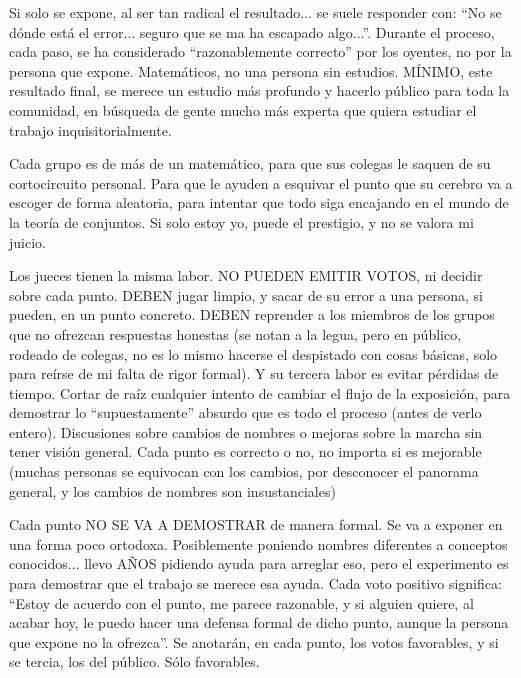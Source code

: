 \noindent
Si solo se expone, al ser tan radical el resultado... se suele responder con: ``No se dónde está el error... seguro que se ma ha escapado algo...''. Durante el proceso, cada paso, se ha considerado ``razonablemente correcto'' por los oyentes, no por la persona que expone. Matemáticos, no una persona sin estudios. MÍNIMO, este resultado final, se merece un estudio más profundo y hacerlo público para toda la comunidad, en búsqueda de gente mucho más experta que quiera estudiar el trabajo inquisitorialmente.

\noindent
Cada grupo es de más de un matemático, para que sus colegas le saquen de su cortocircuito personal. Para que le ayuden a esquivar el punto que su cerebro va a escoger de forma aleatoria, para intentar que todo siga encajando en el mundo de la teoría de conjuntos. Si solo estoy yo, puede el prestigio, y no se valora mi juicio.

\noindent
Los jueces tienen la misma labor. NO PUEDEN EMITIR VOTOS, ni decidir sobre cada punto. DEBEN jugar limpio, y sacar de su error a una persona, si pueden, en un punto concreto. DEBEN reprender a los miembros de los grupos que no ofrezcan respuestas honestas (se notan a la legua, pero en público, rodeado de colegas, no es lo mismo hacerse el despistado con cosas básicas, solo para reírse de mi falta de rigor formal). Y su tercera labor es evitar pérdidas de tiempo. Cortar de raíz cualquier intento de cambiar el flujo de la exposición, para demostrar lo ``supuestamente'' absurdo que es todo el proceso (antes de verlo entero). Discusiones sobre cambios de nombres o mejoras sobre la marcha sin tener visión general. Cada punto es correcto o no, no importa si es mejorable (muchas personas se equivocan con los cambios, por desconocer el panorama general, y los cambios de nombres son insustanciales)

\noindent
Cada punto NO SE VA A DEMOSTRAR de manera formal. Se va a exponer en una forma poco ortodoxa. Posiblemente poniendo nombres diferentes a conceptos conocidos... llevo AÑOS pidiendo ayuda para arreglar eso, pero el experimento es para demostrar que el trabajo se merece esa ayuda. Cada voto positivo significa: ``Estoy de acuerdo con el punto, me parece razonable, y si alguien quiere, al acabar hoy, le puedo hacer una defensa formal de dicho punto, aunque la persona que expone no la ofrezca''. Se anotarán, en cada punto, los votos favorables, y si se tercia, los del público. Sólo favorables.

